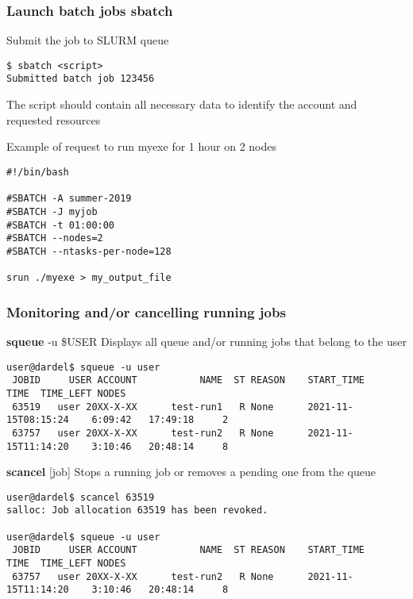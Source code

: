 \begin{frame}[fragile]
\frametitle{Launch batch jobs \hfill  \alert{\textbf{sbatch}}}
\begin{exampleblock}{Submit the job to SLURM queue}
  \begin{verbatim}
$ sbatch <script>
Submitted batch job 123456
  \end{verbatim}
\end{exampleblock}

\scriptsize
The script should contain all necessary data to identify the account and requested resources 
\begin{exampleblock}{Example of request to run myexe for 1 hour on 2 nodes}
\begin{verbatim}
#!/bin/bash

#SBATCH -A summer-2019
#SBATCH -J myjob
#SBATCH -t 01:00:00
#SBATCH --nodes=2
#SBATCH --ntasks-per-node=128

srun ./myexe > my_output_file
\end{verbatim}
\end{exampleblock}

\end{frame}

\begin{frame}[fragile]
\frametitle{Monitoring and/or cancelling running jobs }
\begin{alertblock}{\textbf{squeue} -u  \$USER}
  Displays all queue and/or running jobs that belong to the user
\tiny
  \begin{verbatim}
user@dardel$ squeue -u user
 JOBID     USER ACCOUNT           NAME  ST REASON    START_TIME                TIME  TIME_LEFT NODES
 63519   user 20XX-X-XX      test-run1   R None      2021-11-15T08:15:24    6:09:42   17:49:18     2
 63757   user 20XX-X-XX      test-run2   R None      2021-11-15T11:14:20    3:10:46   20:48:14     8
  \end{verbatim}
\end{alertblock}

\begin{alertblock}{\textbf{scancel} [job]}
Stops a running job or removes a pending one from the queue
\tiny
  \begin{verbatim}
user@dardel$ scancel 63519
salloc: Job allocation 63519 has been revoked.

user@dardel$ squeue -u user
 JOBID     USER ACCOUNT           NAME  ST REASON    START_TIME                TIME  TIME_LEFT NODES
 63757   user 20XX-X-XX      test-run2   R None      2021-11-15T11:14:20    3:10:46   20:48:14     8
  \end{verbatim}
\end{alertblock}
\end{frame}
